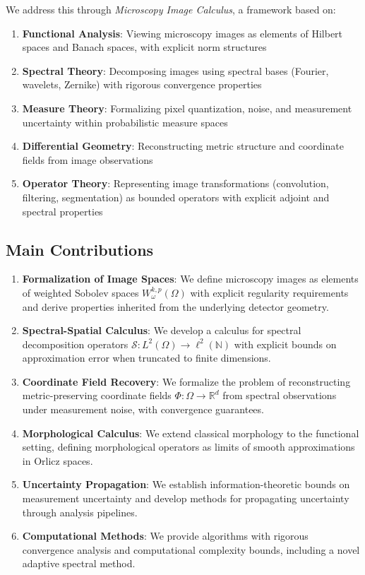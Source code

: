 \documentclass[twocolumn,11pt]{article}
\begin{document}
We address this through \textit{Microscopy Image Calculus}, a framework based on:
\begin{enumerate}
\item \textbf{Functional Analysis}: Viewing microscopy images as elements of Hilbert spaces and Banach spaces, with explicit norm structures
\item \textbf{Spectral Theory}: Decomposing images using spectral bases (Fourier, wavelets, Zernike) with rigorous convergence properties
\item \textbf{Measure Theory}: Formalizing pixel quantization, noise, and measurement uncertainty within probabilistic measure spaces
\item \textbf{Differential Geometry}: Reconstructing metric structure and coordinate fields from image observations
\item \textbf{Operator Theory}: Representing image transformations (convolution, filtering, segmentation) as bounded operators with explicit adjoint and spectral properties
\end{enumerate}

\subsection{Main Contributions}

\begin{enumerate}
\item \textbf{Formalization of Image Spaces}: We define microscopy images as elements of weighted Sobolev spaces $W^{k,p}_\omega(\Omega)$ with explicit regularity requirements and derive properties inherited from the underlying detector geometry.

\item \textbf{Spectral-Spatial Calculus}: We develop a calculus for spectral decomposition operators $\mathcal{S}: L^2(\Omega) \to \ell^2(\mathbb{N})$ with explicit bounds on approximation error when truncated to finite dimensions.

\item \textbf{Coordinate Field Recovery}: We formalize the problem of reconstructing metric-preserving coordinate fields $\Phi: \Omega \to \mathbb{R}^d$ from spectral observations under measurement noise, with convergence guarantees.

\item \textbf{Morphological Calculus}: We extend classical morphology to the functional setting, defining morphological operators as limits of smooth approximations in Orlicz spaces.

\item \textbf{Uncertainty Propagation}: We establish information-theoretic bounds on measurement uncertainty and develop methods for propagating uncertainty through analysis pipelines.

\item \textbf{Computational Methods}: We provide algorithms with rigorous convergence analysis and computational complexity bounds, including a novel adaptive spectral method.
\end{enumerate}
\end{document}
